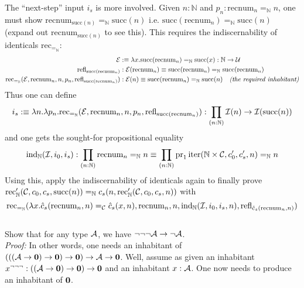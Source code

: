 The ``next-step'' input $i_{s}$ is more involved. Given $n : \mathbb{N}$ and $p_{n} : \text{recnum}_{n} =_{\mathbb{N}} n$, one must show $\text{recnum}_{\text{succ}(n)} =_{\mathbb{N}} \text{succ}(n)$ i.e. $\text{succ}(\text{recnum}_{n}) =_{\mathbb{N}} \text{succ}(n)$ (expand out $\text{recnum}_{\text{succ}(n)}$ to see this). This requires the indiscernability of identicals $\text{rec}_{=_{\mathbb{N}}}$:
\begin{align*}
	\mathcal{E} &:\equiv \lambda x.\text{succ}(\text{recnum}_{n}) =_{\mathbb{N}} \text{succ}(x) : \mathbb{N} \to \mathcal{U} \\
	\text{refl}_{\text{succ}(\text{recnum}_{n})} &: \mathcal{E}(\text{recnum}_{n}) \equiv \text{succ}(\text{recnum}_{n}) =_{\mathbb{N}} \text{succ}(\text{recnum}_{n}) \\
	\text{rec}_{=_{\mathbb{N}}}(\mathcal{E}, \text{recnum}_{n}, n, p_{n}, \text{refl}_{\text{succ}(\text{recnum}_{n})}) &: \mathcal{E}(n) \equiv \text{succ}(\text{recnum}_{n}) =_{\mathbb{N}} \text{succ}(n) \quad \textit{(the required inhabitant)}
\end{align*}
Thus one can define
\[
	i_{s} :\equiv \lambda n. \lambda p_{n}. \text{rec}_{=_{\mathbb{N}}}(\mathcal{E}, \text{recnum}_{n}, n, p_{n}, \text{refl}_{\text{succ}(\text{recnum}_{n})}) : \prod_{(n : \mathbb{N})} \mathcal{I}(n) \to \mathcal{I}(\text{succ}(n))
\]
and one gets the sought-for propositional equality
\[
	\text{ind}_{\mathbb{N}}(\mathcal{I}, i_{0}, i_{s}) : \prod_{(n : \mathbb{N})} \text{recnum}_{n} =_{\mathbb{N}} n \equiv \prod_{(n : \mathbb{N})}\text{pr}_{1}\,\text{iter}(\mathbb{N} \times \mathcal{C}, c'_{0}, c'_{s}, n) =_{\mathbb{N}} n
\]
Using this, apply the indiscernability of identicals again to finally prove $\text{rec}'_{\mathbb{N}}(\mathcal{C}, c_{0}, c_{s}, \text{succ}(n)) =_{\mathbb{N}} c_{s}(n,\text{rec}'_{\mathbb{N}}(\mathcal{C}, c_{0}, c_{s}, n))$ with
\[
	\text{rec}_{=_{\mathbb{N}}}(\lambda x. \hat{c}_{s}(\text{recnum}_{n},n) =_{\mathcal{C}} \hat{c}_{s}(x,n), \text{recnum}_{n}, n, \text{ind}_{\mathbb{N}}(\mathcal{I}, i_{0}, i_{s}, n), \text{refl}_{\hat{c}_{s}(\text{recnum}_{n},n)})
\] \\



 Show that for any type $\mathcal{A}$, we have $\neg\neg\neg \mathcal{A} \to \neg \mathcal{A}$. \\


\textit{Proof:} In other words, one needs an inhabitant of $(((\mathcal{A} \to \textbf{0}) \to \textbf{0}) \to \textbf{0}) \to \mathcal{A} \to \textbf{0}$. Well, assume as given an inhabitant $x^{\neg\neg\neg} : ((\mathcal{A} \to \textbf{0}) \to \textbf{0}) \to \textbf{0}$ and an inhabitant $x : \mathcal{A}$. One now needs to produce an inhabitant of $\textbf{0}$.

